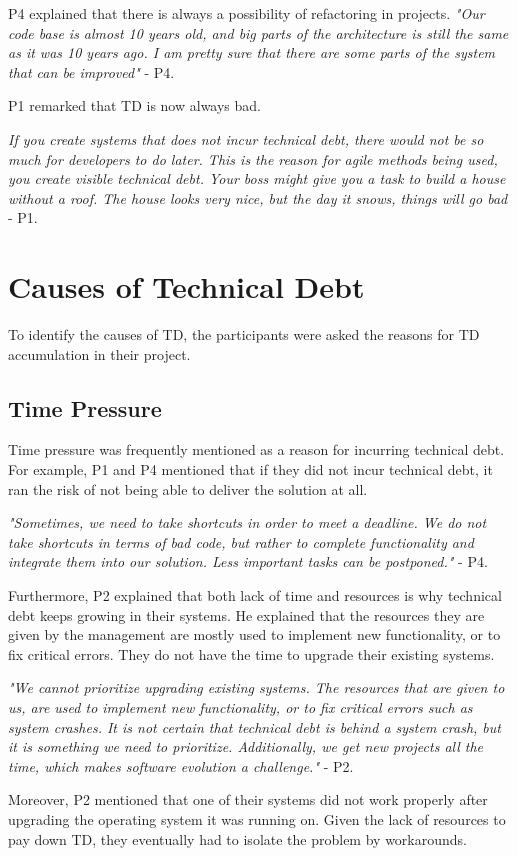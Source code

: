 P4 explained that there is always a possibility of refactoring in projects. \textit{"Our code base is almost 10 years old, and big parts of the architecture is still the same as it was 10 years ago. I am pretty sure that there are some parts of the system that can be improved"} - P4. 

P1 remarked that TD is now always bad.
\begin{displayquote}
\textit{If you create systems that does not incur technical debt, there would not be so much for developers to do later. This is the reason for agile methods being used, you create visible technical debt. Your boss might give you a task to build a house without a roof. The house looks very nice, but the day it snows, things will go bad} - P1.
\end{displayquote}






\section{Causes of Technical Debt}
\label{sec:techCause}
To identify the causes of TD, the participants were asked the reasons for TD accumulation in their project.

\subsection{Time Pressure}
Time pressure was frequently mentioned as a reason for incurring technical debt. For example, P1 and P4 mentioned that if they did not incur technical debt, it ran the risk of not being able to deliver the solution at all. 

\begin{displayquote}
\textit{"Sometimes, we need to take shortcuts in order to meet a deadline. We do not take shortcuts in terms of bad code, but rather to complete functionality and integrate them into our solution. Less important tasks can be postponed."} - P4.
\end{displayquote}

Furthermore, P2 explained that both lack of time and resources is why technical debt keeps growing in their systems. He explained that the resources they are given by the management are mostly used to implement new functionality, or to fix critical errors. They do not have the time to upgrade their existing systems.
\begin{displayquote}
\textit{"We cannot prioritize upgrading existing systems. The resources that are given to us, are used to implement new functionality, or to fix critical errors such as system crashes. It is not certain that technical debt is behind a system crash, but it is something we need to prioritize. Additionally, we get new projects all the time, which makes software evolution a challenge."} - P2.
\end{displayquote} 
Moreover, P2 mentioned that one of their systems did not work properly after upgrading the operating system it was running on. Given the lack of resources to pay down TD, they eventually had to isolate the problem by workarounds. 

